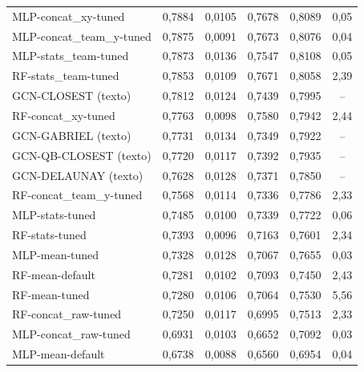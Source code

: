\begin{table}[htbp]
\begin{tabular}{lccccc}
        MLP-concat\_xy-tuned & 0,7884 & 0,0105 & 0,7678 & 0,8089 & 0,05 \\
        MLP-concat\_team\_y-tuned & 0,7875 & 0,0091 & 0,7673 & 0,8076 & 0,04 \\
        MLP-stats\_team-tuned & 0,7873 & 0,0136 & 0,7547 & 0,8108 & 0,05 \\
        RF-stats\_team-tuned & 0,7853 & 0,0109 & 0,7671 & 0,8058 & 2,39 \\
        GCN-CLOSEST (texto) & 0,7812 & 0,0124 & 0,7439 & 0,7995 & -- \\
        RF-concat\_xy-tuned & 0,7763 & 0,0098 & 0,7580 & 0,7942 & 2,44 \\
        GCN-GABRIEL (texto) & 0,7731 & 0,0134 & 0,7349 & 0,7922 & -- \\
        GCN-QB-CLOSEST (texto) & 0,7720 & 0,0117 & 0,7392 & 0,7935 & -- \\
        GCN-DELAUNAY (texto) & 0,7628 & 0,0128 & 0,7371 & 0,7850 & -- \\
        RF-concat\_team\_y-tuned & 0,7568 & 0,0114 & 0,7336 & 0,7786 & 2,33 \\
        MLP-stats-tuned & 0,7485 & 0,0100 & 0,7339 & 0,7722 & 0,06 \\
        RF-stats-tuned & 0,7393 & 0,0096 & 0,7163 & 0,7601 & 2,34 \\
        MLP-mean-tuned & 0,7328 & 0,0128 & 0,7067 & 0,7655 & 0,03 \\
        RF-mean-default & 0,7281 & 0,0102 & 0,7093 & 0,7450 & 2,43 \\
        RF-mean-tuned & 0,7280 & 0,0106 & 0,7064 & 0,7530 & 5,56 \\
        RF-concat\_raw-tuned & 0,7250 & 0,0117 & 0,6995 & 0,7513 & 2,33 \\
        MLP-concat\_raw-tuned & 0,6931 & 0,0103 & 0,6652 & 0,7092 & 0,03 \\
        MLP-mean-default & 0,6738 & 0,0088 & 0,6560 & 0,6954 & 0,04 \\
        \hline
    \end{tabular}
\end{table}
